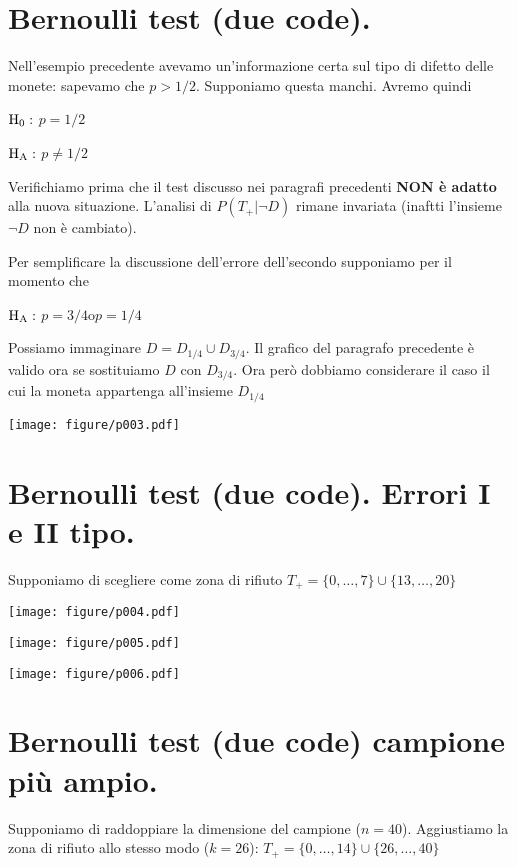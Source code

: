 \documentclass[10pt,openany]{book}
\def\H0{{\rm H_0}}
\def\HA{{\rm H_A}}
\theoremstyle{mio}
\theoremstyle{liscio}
\begin{document}
\clearpage\section{Bernoulli test (due code).}

Nell'esempio precedente avevamo un'informazione certa sul tipo di difetto delle monete: sapevamo che $p>1/2$. Supponiamo questa manchi. Avremo quindi

$\H0:$ $p=1/2$

$\HA:$ $p\neq1/2$

Verifichiamo prima che il test discusso nei paragrafi precedenti \textbf{NON è adatto\/} alla nuova situazione. L'analisi di $P(T_+|\neg D)$ rimane invariata (inaftti l'insieme $\neg D$ non è cambiato).

Per semplificare la discussione dell'errore dell'secondo supponiamo per il momento che 

$\HA:$ $p=3/4$\quad o\quad $p=1/4$ 

Possiamo immaginare $D=D_{1/4}\cup D_{3/4}$. Il grafico del paragrafo precedente è valido ora se sostituiamo $D$ con $D_{3/4}$. Ora però dobbiamo considerare il caso il cui la moneta appartenga all'insieme $D_{1/4}$

\hfil\texttt{[image: figure/p003.pdf]}


\clearpage\section{Bernoulli test (due code). Errori I e II tipo.}

Supponiamo di scegliere come zona di rifiuto $T_+=\{0,\dots,7\}\cup \{13,\dots,20\}$

\hfil\texttt{[image: figure/p004.pdf]}

\hfil\texttt{[image: figure/p005.pdf]}

\hfil\texttt{[image: figure/p006.pdf]}





\clearpage\section{Bernoulli test (due code) campione più ampio.}

Supponiamo di raddoppiare la dimensione del campione ($n=40$). Aggiustiamo la zona di rifiuto allo stesso modo ($k=26$):  $T_+=\{0,\dots,14\}\cup \{26,\dots,40\}$
\end{document}
